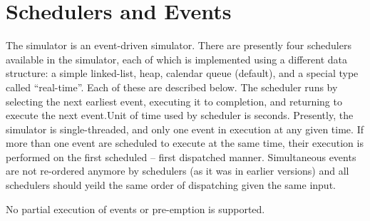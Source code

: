 \section{Schedulers and Events}
\label{sec:sched}

The simulator is an event-driven simulator.
There are presently four schedulers available in the simulator, each
of which is implemented using a different data structure:
a simple linked-list, heap, calendar queue (default), and a special
type called ``real-time''.  Each of these are described below.
The scheduler runs by selecting the next earliest event, executing
it to completion, and returning to execute the next event.Unit of time used by scheduler is seconds.
Presently, the simulator is single-threaded, and only one event
in execution at any given time.
If more than one event are scheduled to execute at the same time,
their execution is performed on the first scheduled -- first
dispatched manner.  Simultaneous events are not re-ordered anymore by
schedulers (as it was in earlier versions) and all schedulers should
yeild the same order of dispatching given the same input.
 
No partial execution of events or pre-emption is supported.

